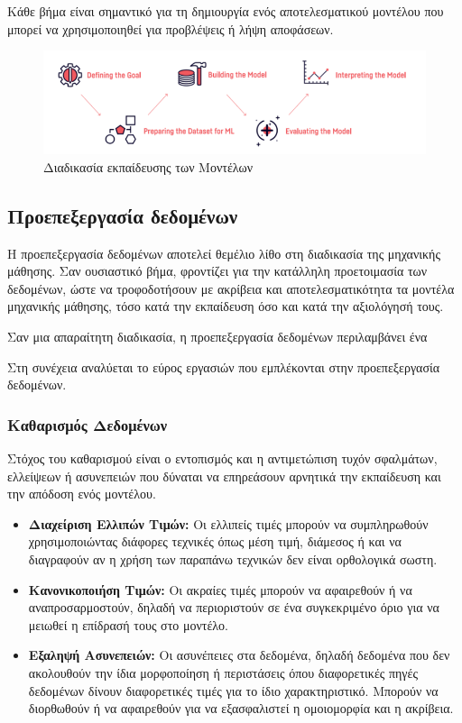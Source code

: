 \documentclass[12pt,twoside]{article}
\newcommand{\gr}{\selectlanguage{greek}}
\begin{document}
Κάθε βήμα είναι σημαντικό για τη δημιουργία ενός αποτελεσματικού μοντέλου που μπορεί να χρησιμοποιηθεί για προβλέψεις ή λήψη αποφάσεων.


\begin{figure}[ht!]
\centering
\includegraphics[width= 140mm]{ml_process.png}
\caption{\gr Διαδικασία εκπαίδευσης των Μοντέλων \label{overflow}}
\end{figure}
\subsection{\gr Προεπεξεργασία δεδομένων}

Η προεπεξεργασία δεδομένων αποτελεί θεμέλιο λίθο στη διαδικασία της μηχανικής μάθησης. Σαν ουσιαστικό βήμα, φροντίζει για την κατάλληλη προετοιμασία των δεδομένων, ώστε να τροφοδοτήσουν με ακρίβεια και αποτελεσματικότητα τα μοντέλα μηχανικής μάθησης, τόσο κατά την εκπαίδευση όσο και κατά την αξιολόγησή τους.

Σαν μια απαραίτητη διαδικασία, η προεπεξεργασία δεδομένων περιλαμβάνει ένα

Στη συνέχεια αναλύεται το εύρος εργασιών που εμπλέκονται στην προεπεξεργασία δεδομένων.

\subsubsection{\gr Καθαρισμός Δεδομένων}

Στόχος του καθαρισμού είναι ο εντοπισμός και η αντιμετώπιση τυχόν σφαλμάτων, ελλείψεων ή ασυνεπειών που δύναται να επηρεάσουν αρνητικά την εκπαίδευση και την απόδοση ενός μοντέλου.

\begin{itemize}
    \item \textbf{\gr Διαχείριση Ελλιπών Τιμών:} Οι ελλιπείς τιμές μπορούν να συμπληρωθούν χρησιμοποιώντας διάφορες τεχνικές όπως μέση τιμή, διάμεσος ή και να διαγραφούν αν η χρήση των παραπάνω τεχνικών δεν είναι ορθολογικά σωστη.
    \item \textbf{\gr Κανονικοποιήση Τιμών:} Οι ακραίες τιμές μπορούν να αφαιρεθούν ή να αναπροσαρμοστούν, δηλαδή να περιοριστούν σε ένα συγκεκριμένο όριο για να μειωθεί η επίδρασή τους στο μοντέλο.
    \item \textbf{\gr Εξαληψή Ασυνεπειών:} Οι ασυνέπειες στα δεδομένα, δηλαδή δεδομένα που δεν ακολουθούν την ίδια μορφοποίηση ή περιστάσεις όπου διαφορετικές πηγές δεδομένων δίνουν διαφορετικές τιμές για το ίδιο χαρακτηριστικό. Μπορούν να διορθωθούν ή να αφαιρεθούν για να εξασφαλιστεί η ομοιομορφία και η ακρίβεια.
\end{itemize}
\end{document}
